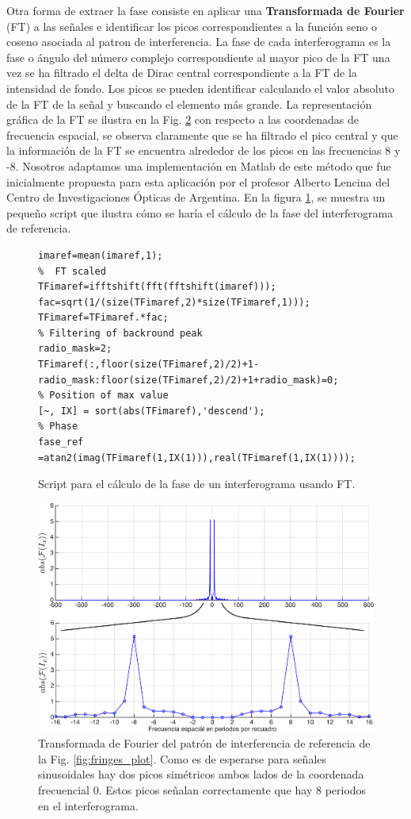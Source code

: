 Otra forma de extraer la fase consiste en aplicar una \textbf{Transformada de
Fourier} (FT) a las señales e identificar los picos correspondientes a
la función seno o coseno asociada al patron de interferencia. La fase
de cada interferograma es la fase o ángulo del número complejo 
correspondiente al mayor pico de la FT una vez se ha filtrado el delta
de Dirac central correspondiente a la FT de la intensidad de fondo.  
Los picos se pueden identificar calculando el valor absoluto de la FT de
la señal y buscando el elemento más grande. La representación gráfica
de la FT se ilustra en la Fig. \ref{fig:fringes_f} con respecto a las
coordenadas de frecuencia espacial, se observa claramente que se ha
filtrado el pico central y que la información de la FT se encuentra
alrededor de los picos en las frecuencias  8 y -8. Nosotros adaptamos
una implementación en Matlab de este método que fue inicialmente
propuesta para esta aplicación por el profesor Alberto Lencina del Centro de
Investigaciones Ópticas de Argentina. En la figura \ref{fig:fourier_script}, se muestra un
pequeño script que ilustra cómo se haría el cálculo de la fase del
interferograma de referencia.     
 \begin{figure}
\begin{lstlisting}[style=Matlab]
%  Reference image
imaref=mean(imaref,1);
%  FT scaled 
TFimaref=ifftshift(fft(fftshift(imaref)));
fac=sqrt(1/(size(TFimaref,2)*size(TFimaref,1)));
TFimaref=TFimaref.*fac;
% Filtering of backround peak
radio_mask=2;
TFimaref(:,floor(size(TFimaref,2)/2)+1-radio_mask:floor(size(TFimaref,2)/2)+1+radio_mask)=0;
% Position of max value
[~, IX] = sort(abs(TFimaref),'descend');
% Phase
fase_ref =atan2(imag(TFimaref(1,IX(1))),real(TFimaref(1,IX(1))));
\end{lstlisting}
 \caption{Script para el cálculo de la fase de un interferograma usando
 FT.}
 \label{fig:fourier_script}
 \end{figure}
\begin{figure}
\centering
\includegraphics[scale=0.4]{fringes_f_both.pdf}
\caption[Transformada de Fourier de un patrón de
interferencia]{Transformada de Fourier del patrón de interferencia de referencia de la Fig. \ref{fig:fringes_plot}. Como es de
  esperarse para señales sinusoidales hay dos picos simétricos ambos
  lados de la coordenada frecuencial 0. Estos picos señalan correctamente que hay 8
  periodos en el interferograma.}
\label{fig:fringes_f}
\end{figure}
